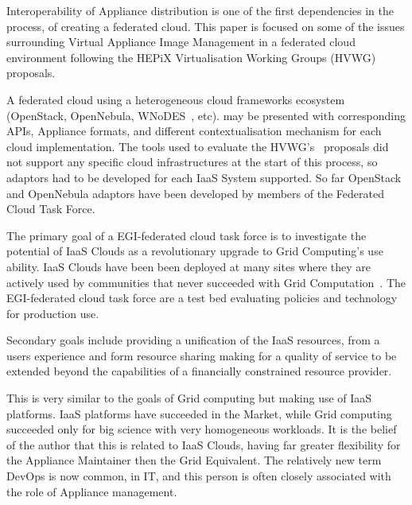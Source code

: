 \documentclass[oribibl]{llncs}
\begin{document}
Interoperability of Appliance distribution is one of the first dependencies in the process, of creating a federated cloud. This paper is focused on some of the issues surrounding Virtual Appliance Image Management in a federated cloud environment following the HEPiX Virtualisation Working Groups (HVWG)~\cite{hepix} proposals.

A federated cloud using a heterogeneous cloud frameworks ecosystem (OpenStack, OpenNebula, WNoDES~\cite{wnodes}, etc). may be presented with corresponding APIs, Appliance formats, and different contextualisation mechanism for each cloud implementation. The tools used to evaluate the HVWG's~\cite{hepix} proposals did not support any specific cloud infrastructures at the start of this process, so adaptors had to be developed for each IaaS System supported. So far OpenStack and  OpenNebula adaptors have been developed by members of the Federated Cloud Task Force.


The primary goal of a EGI-federated cloud task force is to investigate the potential of IaaS Clouds as a revolutionary upgrade to Grid Computing's use ability. IaaS Clouds have been been deployed at many sites where they are actively used by communities that never succeeded with Grid Computation~\cite{gridcloud}. The EGI-federated cloud task force are a test bed evaluating policies and technology for production use.

Secondary goals include providing a unification of the IaaS resources, from a users experience and form resource sharing making for a quality of service to be extended beyond the capabilities of a financially constrained resource provider.

This is very similar to the goals of Grid computing but making use of IaaS platforms. IaaS platforms have succeeded in the Market, while Grid computing succeeded only for big science with very homogeneous workloads. It is the belief of the author that this is related to IaaS Clouds, having far greater flexibility for the Appliance Maintainer then the Grid Equivalent. The relatively new term DevOps is now common, in IT, and this person is often closely associated with the role of Appliance management.
\end{document}
